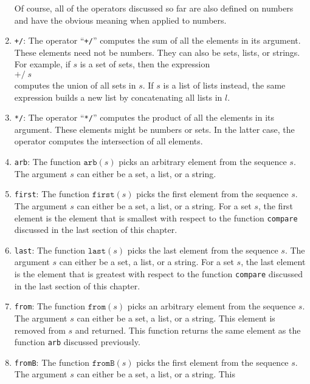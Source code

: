 \begin{enumerate}
      Of course, all of the operators discussed so far are also defined on numbers and
      have the obvious meaning when applied to numbers.
\item \texttt{+/}:  The operator ``\texttt{+/}'' computes the sum of all the elements
      in its argument.  These elements need not be numbers.  They can also be sets, lists,
      or strings.  For example, if $s$ is a set of sets, then the expression 
      \\[0.2cm]
      \hspace*{1.3cm}
      $\texttt{+/}\;s$
      \\[0.2cm]
      computes the union of all sets in $s$.  If $s$ is a list of lists instead, the same
      expression builds a new list by concatenating all lists in $l$.
\item \texttt{*/}:  The operator ``\texttt{*/}'' computes the product of all the elements
      in its argument.  These elements might be  numbers or sets.  In the latter case,
      the operator computes the intersection of all elements.
\item \texttt{arb}: The function $\texttt{arb}(s)$ picks an arbitrary element from the
      sequence $s$.  The argument $s$ can either be a set, a list, or a string.
\item \texttt{first}: The function $\texttt{first}(s)$ picks the first  element from the
      sequence $s$.  The argument $s$ can either be a set, a list, or a string.
      For a set $s$, the first element is the element that is smallest with respect to the
      function \texttt{compare} discussed in the last section of this chapter.
\item \texttt{last}: The function $\texttt{last}(s)$ picks the last element from the
      sequence $s$.  The argument $s$ can either be a set, a list, or a string.
      For a set $s$, the last element is the element that is greatest with respect to the
      function \texttt{compare} discussed in the last section of this chapter.
\item \texttt{from}: The function $\texttt{from}(s)$ picks an arbitrary element from the
      sequence $s$.  The argument $s$ can either be a set, a list, or a string.  This
      element is removed from $s$ and returned.  This function returns the same element as
      the function \texttt{arb} discussed previously.
\item \texttt{fromB}: The function $\texttt{fromB}(s)$ picks the first element from the
      sequence $s$.  The argument $s$ can either be a set, a list, or a string.  This

\end{enumerate}
